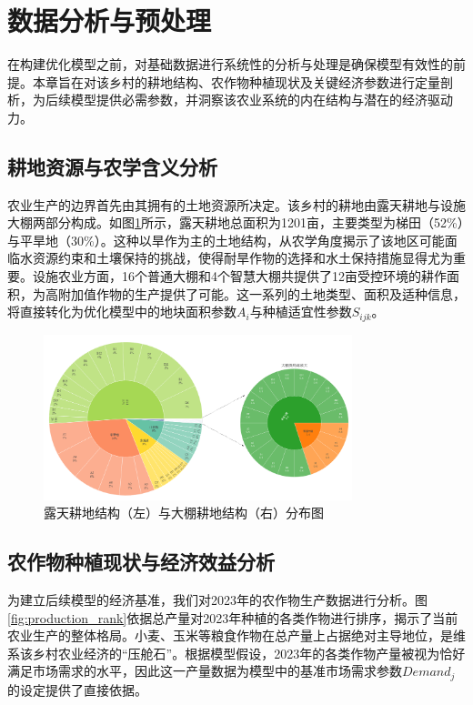 \section{数据分析与预处理}

在构建优化模型之前，对基础数据进行系统性的分析与处理是确保模型有效性的前提。本章旨在对该乡村的耕地结构、农作物种植现状及关键经济参数进行定量剖析，为后续模型提供必需参数，并洞察该农业系统的内在结构与潜在的经济驱动力。

\subsection{耕地资源与农学含义分析}

农业生产的边界首先由其拥有的土地资源所决定。该乡村的耕地由露天耕地与设施大棚两部分构成。如图\ref{fig:land_structure}所示，露天耕地总面积为1201亩，主要类型为梯田（52\%）与平旱地（30\%）。这种以旱作为主的土地结构，从农学角度揭示了该地区可能面临水资源约束和土壤保持的挑战，使得耐旱作物的选择和水土保持措施显得尤为重要。设施农业方面，16个普通大棚和4个智慧大棚共提供了12亩受控环境的耕作面积，为高附加值作物的生产提供了可能。这一系列的土地类型、面积及适种信息，将直接转化为优化模型中的地块面积参数$A_i$与种植适宜性参数$S_{ijk}$。

\begin{figure}[t]
	\centering
	\includegraphics[width=0.8\textwidth]{../figures/0_1.png}
	\caption{露天耕地结构（左）与大棚耕地结构（右）分布图}
	\label{fig:land_structure}
\end{figure}

\subsection{农作物种植现状与经济效益分析}

为建立后续模型的经济基准，我们对2023年的农作物生产数据进行分析。图\ref{fig:production_rank}依据总产量对2023年种植的各类作物进行排序，揭示了当前农业生产的整体格局。小麦、玉米等粮食作物在总产量上占据绝对主导地位，是维系该乡村农业经济的“压舱石”。根据模型假设，2023年的各类作物产量被视为恰好满足市场需求的水平，因此这一产量数据为模型中的基准市场需求参数$Demand_j$的设定提供了直接依据。

